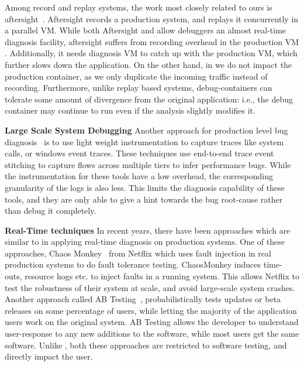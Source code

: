 Among record and replay systems, the work most closely related to ours is aftersight~\cite{aftersight}. 
Aftersight records a production system, and replays it concurrently in a parallel VM.
While both Aftersight and \parikshan allow debuggers an almost real-time diagnosis facility, aftersight suffers from recording overhead in the production VM .
Additionally, it needs diagnosis VM to catch up with the production VM, which further slows down the application.
On the other hand, in \parikshan we do not impact the production container, as we only duplicate the incoming traffic instead of recording.
Furthermore, unlike replay based systems, \parikshan debug-containers can tolerate some amount of divergence from the original application: i.e., the debug container may continue to run even if the analysis slightly modifies it.
  
\noindent
\textbf{Large Scale System Debugging}
Another approach for production level bug diagnosis~\cite{magpie,clue,vpath} is to use light weight instrumentation to capture traces like system calls, or windows event traces.
These techniques use end-to-end trace event stitching to capture flows across multiple tiers to infer performance bugs.
While the instrumentation for these tools have a low overhead, the corresponding granularity of the logs is also less.
This limits the diagnosis capability of these tools, and they are only able to give a hint towards the bug root-cause rather than debug it completely.

\noindent
\textbf{Real-Time techniques}
In recent years, there have been approaches which are similar to \parikshan in applying real-time diagnosis on production systems.
One of these approaches, Chaos Monkey~\cite{chaosmonkey} from Netflix which uses fault injection in real production systems to do fault tolerance testing.
ChaosMonkey induces time-outs, resource hogs etc. to inject faults in a running system. 
This allows Netflix to test the robustness of their system at scale, and avoid large-scale system crashes.  
Another approach called AB Testing~\cite{abtesting}, probabilistically tests updates or beta releases on some percentage of users, while letting the majority of the application users work on the original system.
AB Testing allows the developer to understand user-response to any new additions to the software, while most users get the same software.
Unlike \parikshan, both these approaches are restricted to software testing, and directly impact the user.

